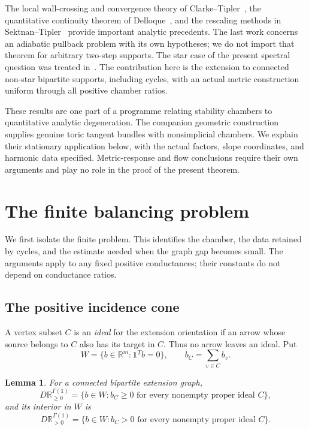 \documentclass[11pt]{amsart}
\newtheorem{lemma}[theorem]{Lemma}
\theoremstyle{definition}
\theoremstyle{remark}
\newcommand{\RR}{\mathbb R}
\newcommand{\one}{\mathbf 1}
\begin{document}
The local wall-crossing and convergence theory of
Clarke--Tipler~\cite{clarketipler2024}, the quantitative continuity
theorem of Delloque~\cite{delloque2025}, and the rescaling methods in
Sektnan--Tipler~\cite{sektnantipler2024} provide important analytic
precedents. The last work concerns an adiabatic pullback problem with
its own hypotheses; we do not import that theorem for arbitrary
two-step supports. The star case of the present spectral question
was treated in~\cite{wuebben2026walls}. The contribution here is the
extension to connected non-star bipartite supports, including cycles,
with an actual metric construction uniform through all positive
chamber ratios.

These results are one part of a programme relating stability chambers
to quantitative analytic degeneration. The companion geometric
construction supplies genuine toric tangent bundles with
nonsimplicial chambers. We explain their stationary application
below, with the actual factors, slope coordinates, and harmonic
data specified. Metric-response and flow conclusions require their
own arguments and play no role in the proof of the present theorem.

\section{The finite balancing problem}\label{sec02:balancing}

We first isolate the finite problem. This identifies the chamber,
the data retained by cycles, and the estimate needed when the graph
gap becomes small. The arguments apply to any fixed positive
conductances; their constants do not depend on conductance ratios.

\subsection{The positive incidence cone}

A vertex subset \(C\) is an \emph{ideal} for the extension orientation
if an arrow whose source belongs to \(C\) also has its target in
\(C\). Thus no arrow leaves an ideal. Put
\[
 W=\{b\in\RR^m:\one^Tb=0\},\qquad
 b_C=\sum_{v\in C}b_v.
\]

\begin{lemma}\label{lem02:cone}
For a connected bipartite extension graph,
\[
 D\RR_{\geq0}^{\Gamma(1)}
 =\{b\in W:b_C\geq0\text{ for every nonempty proper ideal }C\},
\]
and its interior in \(W\) is
\[
 D\RR_{>0}^{\Gamma(1)}
 =\{b\in W:b_C>0\text{ for every nonempty proper ideal }C\}.
\]
\end{lemma}
\end{document}

